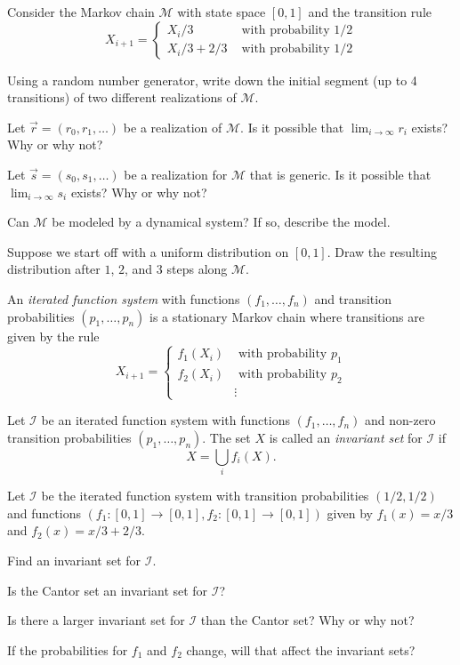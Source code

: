 	\question
	Consider the Markov chain $\mathcal M$ with state space $[0,1]$ and the transition rule
	\[
		X_{i+1} =\begin{cases}
			X_i/3 &\text{ with probability $1/2$}\\
			X_i/3 + 2/3 &\text{ with probability $1/2$}
		\end{cases}
	\]
	\begin{parts}
		\item Using a random number generator, write down the initial segment (up to 4 transitions) of two
		different realizations of $\mathcal M$.
		\item Let $\vec r=(r_0,r_1,\ldots)$ be a realization of $\mathcal M$. Is it possible that
			$\lim_{i\to\infty} r_i$ exists? Why or why not?
		\item Let $\vec s=(s_0,s_1,\ldots)$ be a realization for $\mathcal M$ that is generic. 
			Is it possible that
			$\lim_{i\to\infty} s_i$ exists? Why or why not?
		\item Can $\mathcal M$ be modeled by a dynamical system? If so, describe the model.
		\item Suppose we start off with a uniform distribution on $[0,1]$. Draw the
			resulting distribution after $1$, $2$, and $3$ steps along $\mathcal M$. 
	\end{parts}

	\newpage
	\begin{definition}
		An \emph{iterated function system} with functions $(f_1,\ldots,f_n)$
		and transition probabilities $(p_1,\ldots,p_n)$ 
		is a stationary Markov chain where transitions are given by the rule
		\[
			X_{i+1} =
			\begin{cases}
				f_1(X_i) &\text{ with probability $p_1$}\\
				f_2(X_i) &\text{ with probability $p_2$}\\
				& \vdots 
			\end{cases}
		\]
	\end{definition}

	\begin{definition}
		Let $\mathcal I$ be an iterated function system with functions 
		$(f_1,\ldots,f_n)$ and non-zero transition probabilities $(p_1,\ldots,p_n)$.
		The set $X$ is called an \emph{invariant set} for $\mathcal I$ if
		\[
			X=\bigcup_i f_i(X).
		\]
	\end{definition}

	\question
	Let $\mathcal I$ be the iterated function system with transition probabilities $(1/2,1/2)$
	and functions $(f_1:[0,1]\to[0,1],f_2:[0,1]\to[0,1])$ given by
	$f_1(x)=x/3$ and $f_2(x)=x/3+2/3$.
	\begin{parts}
		\item Find an invariant set for $\mathcal I$.
		\item Is the Cantor set an invariant set for $\mathcal I$?
		\item Is there a larger invariant set for $\mathcal I$ than the Cantor set? Why or why not?
		\item If the probabilities for $f_1$ and $f_2$ change, will that affect the invariant sets?
	\end{parts}

